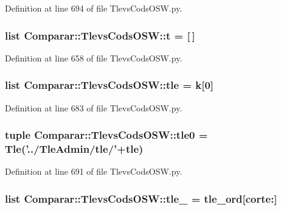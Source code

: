 \-Definition at line 694 of file \-Tlevs\-Cods\-O\-S\-W.\-py.

\subsubsection[{t}]{\setlength{\rightskip}{0pt plus 5cm}list {\bf \-Comparar\-::\-Tlevs\-Cods\-O\-S\-W\-::t} = [$\,$]}\label{namespace_comparar_1_1_tlevs_cods_o_s_w_a573d95346e8f216e0115deb293eecfa6}


\-Definition at line 658 of file \-Tlevs\-Cods\-O\-S\-W.\-py.

\subsubsection[{tle}]{\setlength{\rightskip}{0pt plus 5cm}list {\bf \-Comparar\-::\-Tlevs\-Cods\-O\-S\-W\-::tle} = k[0]}\label{namespace_comparar_1_1_tlevs_cods_o_s_w_ad5fef370da15e7e3e9fa5434f24e419d}


\-Definition at line 683 of file \-Tlevs\-Cods\-O\-S\-W.\-py.

\subsubsection[{tle0}]{\setlength{\rightskip}{0pt plus 5cm}tuple {\bf \-Comparar\-::\-Tlevs\-Cods\-O\-S\-W\-::tle0} = {\bf \-Tle}('../\-Tle\-Admin/{\bf tle}/'+{\bf tle})}\label{namespace_comparar_1_1_tlevs_cods_o_s_w_a76fc5a1006fc5c6c6a11953bbd2b9379}


\-Definition at line 691 of file \-Tlevs\-Cods\-O\-S\-W.\-py.

\subsubsection[{tle\-\_\-15}]{\setlength{\rightskip}{0pt plus 5cm}list {\bf \-Comparar\-::\-Tlevs\-Cods\-O\-S\-W\-::tle\-\_} = {\bf tle\-\_\-ord}[corte\-:]}\label{namespace_comparar_1_1_tlevs_cods_o_s_w_a7a65b12548a20c0076b5a3e2dd451e28}


